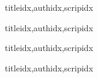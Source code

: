\documentclass[letterpaper]{article}
\begin{document}
\begin{songs}{titleidx,authidx,scripidx}

\end{songs}

\begin{songs}{titleidx,authidx,scripidx}

\end{songs}

\begin{songs}{titleidx,authidx,scripidx}

\end{songs}

\begin{songs}{titleidx,authidx,scripidx}

\end{songs}
\end{document}
